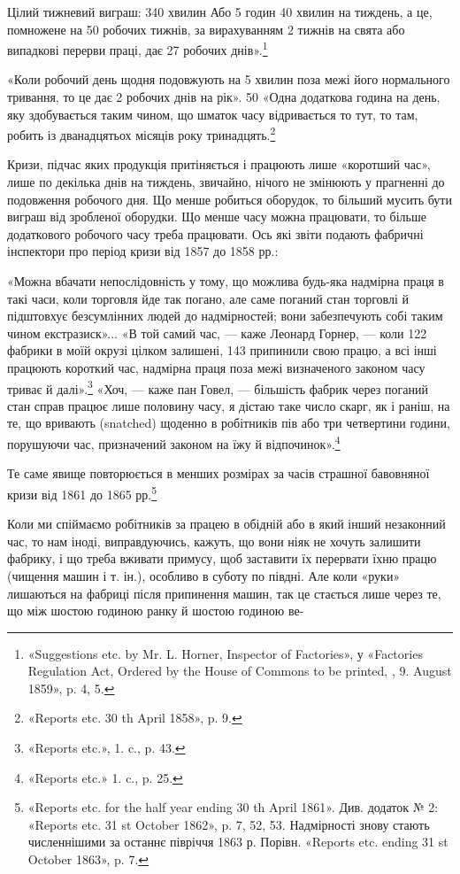 Цілий тижневий
виграш:
340 хвилин
Або 5 годин 40 хвилин на тиждень, а це, помножене на 50
робочих тижнів, за вирахуванням 2 тижнів на свята або випадкові
перерви праці, дає 27 робочих днів».\footnote{
«Suggestions etc. by Mr. L. Horner, Inspector of Factories», у
«Factories Regulation Act, Ordered by the House of Commons to be printed, ,
9. August 1859», p. 4, 5.
}

«Коли робочий день щодня подовжують на 5 хвилин поза
межі його нормального тривання, то це дає 2 робочих днів на
рік». 50 «Одна додаткова година на день, яку здобувається таким
чином, що шматок часу відривається то тут, то там, робить із
дванадцятьох місяців року тринадцять.\footnote{
«Reports etc. 30 th April 1858», p. 9.
}

Кризи, підчас яких продукція притіняється і працюють лише
«коротший час», лише по декілька днів на тиждень, звичайно,
нічого не змінюють у прагненні до подовження робочого дня.
Що менше робиться оборудок, то більший мусить бути виграш
від зробленої оборудки. Що менше часу можна працювати, то
більше додаткового робочого часу треба працювати. Ось які
звіти подають фабричні інспектори про період кризи від 1857 до
1858 рр.:

«Можна вбачати непослідовність у тому, що можлива будь-яка
надмірна праця в такі часи, коли торговля йде так погано,
але саме поганий стан торговлі й підштовхує безсумлінних людей
до надмірностей; вони забезпечують собі таким чином екстразиск»...
«В той самий час, — каже Леонард Горнер, — коли
122 фабрики в моїй окрузі цілком залишені, 143 припинили свою
працю, а всі інші працюють короткий час, надмірна праця поза
межі визначеного законом часу триває й далі».\footnote{
«Reports etc.», 1. c., p. 43.
} «Хоч, — каже
пан Говел, — більшість фабрик через поганий стан справ працює
лише половину часу, я дістаю таке число скарг, як і раніш, на
те, що вривають (snatched) щоденно в робітників пів або три
четвертини години, порушуючи час, призначений законом на
їжу й відпочинок».\footnote{
«Reports etc.» 1. c., p. 25.
}

Те саме явище повторюється в менших розмірах за часів страшної
бавовняної кризи від 1861 до 1865 рр.\footnote{
«Reports etc. for the half year ending 30 th April 1861». Див. додаток
№ 2: «Reports etc. 31 st October 1862», p. 7, 52, 53. Надмірності знову
стають численнішими за останнє півріччя 1863 р. Порівн. «Reports etc.
ending 31 st October 1863», p. 7.
}

Коли ми спіймаємо робітників за працею в обідній або в який
інший незаконний час, то нам іноді, виправдуючись, кажуть,
що вони ніяк не хочуть залишити фабрику, і що треба вживати
примусу, щоб заставити їх перервати їхню працю (чищення машин
і т. ін.), особливо в суботу по півдні. Але коли «руки» лишаються
на фабриці після припинення машин, так це стається лише
через те, що між шостою годиною ранку й шостою годиною ве-

